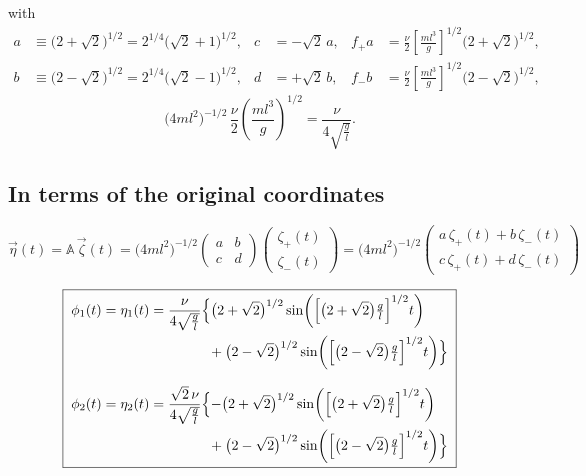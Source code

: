 \documentclass[11pt]{article}
\newcommand{\Am}{\mathbb{A}}
\begin{document}
\noindent with
\begin{align*}
  a &\equiv \bigl(2+\sqrt2\bigr)^{1/2} = 2^{1/4}\bigl(\sqrt2+1\bigr)^{1/2},
    & c &= -\sqrt2\,a,
    & f_+ a &= \frac{\nu}{2}\left[\frac{ml^3}{g}\right]^{1/2}\bigl(2+\sqrt2\bigr)^{1/2},\\
  b &\equiv \bigl(2-\sqrt2\bigr)^{1/2} = 2^{1/4}\bigl(\sqrt2-1\bigr)^{1/2},
    & d &= +\sqrt2\,b,
    & f_- b &= \frac{\nu}{2}\left[\frac{ml^3}{g}\right]^{1/2}\bigl(2-\sqrt2\bigr)^{1/2},
\end{align*}
\begin{equation*}
  \bigl(4ml^2\bigr)^{-1/2}\,\frac{\nu}{2}\left(\frac{ml^3}{g}\right)^{1/2}
  = \frac{\nu}{4\sqrt{\frac{g}{l}}} .
\end{equation*}

\subsection*{In terms of the original coordinates}

\begin{equation*}
  \vec\eta(t) = \Am\,\vec\zeta(t)
  = \bigl(4ml^2\bigr)^{-1/2}\begin{pmatrix}a & b\\ c & d\end{pmatrix}
    \begin{pmatrix}\zeta_+(t)\\ \zeta_-(t)\end{pmatrix}
  = \bigl(4ml^2\bigr)^{-1/2}
    \begin{pmatrix}a\,\zeta_+(t) + b\,\zeta_-(t)\\[2pt] c\,\zeta_+(t) + d\,\zeta_-(t)\end{pmatrix}
\end{equation*}

\begin{equation*}
  \boxed{\;
  \begin{aligned}
    \phi_1(t) = \eta_1(t)
      &= \frac{\nu}{4\sqrt{\frac{g}{l}}}
         \Bigl\{\bigl(2+\sqrt2\bigr)^{1/2}
           \sin\!\left(\Bigl[\bigl(2+\sqrt2\bigr)\tfrac{g}{l}\Bigr]^{1/2} t\right)\\
      &\hspace{4.2em}+ \bigl(2-\sqrt2\bigr)^{1/2}
           \sin\!\left(\Bigl[\bigl(2-\sqrt2\bigr)\tfrac{g}{l}\Bigr]^{1/2} t\right)\Bigr\}\\[8pt]
    \phi_2(t) = \eta_2(t)
      &= \frac{\sqrt2\,\nu}{4\sqrt{\frac{g}{l}}}
         \Bigl\{-\bigl(2+\sqrt2\bigr)^{1/2}
           \sin\!\left(\Bigl[\bigl(2+\sqrt2\bigr)\tfrac{g}{l}\Bigr]^{1/2} t\right)\\
      &\hspace{4.2em}+ \bigl(2-\sqrt2\bigr)^{1/2}
           \sin\!\left(\Bigl[\bigl(2-\sqrt2\bigr)\tfrac{g}{l}\Bigr]^{1/2} t\right)\Bigr\}
  \end{aligned}\;}
\end{equation*}
\end{document}

